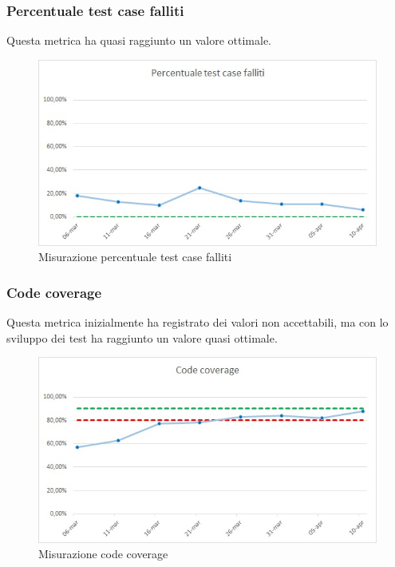 \subsubsection{Percentuale test case falliti}
Questa metrica ha quasi raggiunto un valore ottimale.
\begin{figure} [H]
	\centering
	\includegraphics[scale=1]{Img/testNoPas}
	\caption{Misurazione percentuale test case falliti}\label{}
\end{figure}

\subsubsection{Code coverage}
Questa metrica inizialmente ha registrato dei valori non accettabili, ma con lo sviluppo dei test ha raggiunto un valore quasi ottimale.
\begin{figure} [H]
	\centering
	\includegraphics[scale=1]{Img/CC}
	\caption{Misurazione code coverage}\label{}
\end{figure}

